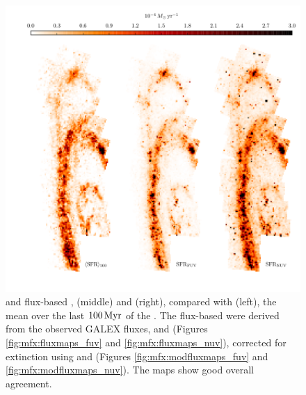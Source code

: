 \documentclass[iop, tighten]{emulateapj}
\begin{document}
\begin{figure}
\centering
\includegraphics[width=\textwidth]{m31flux-figures/sfrmaps1.pdf}
\caption[\sfr{} maps from estimates based on observed fluxes compared with the
mean \sfr{} map from the .]{\fuv{} and \nuv{} flux-based ,
    \sfrfuv{} (middle) and \sfrnuv{} (right), compared with \sfroneh{} (left),
    the mean \sfr{} over the last $100\,\mathrm{Myr}$ of the . The flux-based
     were derived from the observed GALEX fluxes, \fuvobs{} and
    \nuvobs{} (Figures \ref{fig:mfx:fluxmaps_fuv} and
    \ref{fig:mfx:fluxmaps_nuv}), corrected for extinction using \afuv{} and
    \anuv{} (Figures \ref{fig:mfx:modfluxmaps_fuv} and
    \ref{fig:mfx:modfluxmaps_nuv}). The \sfr{} maps show good overall
    agreement.
}
\label{fig:mfx:sfrmaps1}
\end{figure}
\end{document}
